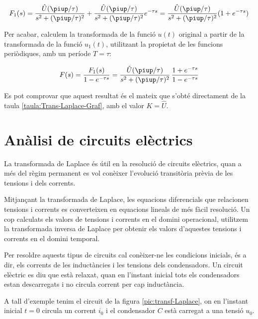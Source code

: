 \begin{exemple}[\CalcTransfLaplace{}]
    \[
        F_1(s) = \frac{\hat{U} (\piup/\tau)}{s^2 + (\piup/\tau)^2} +
        \frac{\hat{U} (\piup/\tau)}{s^2 + (\piup/\tau)^2} e^{-\tau s} =
        \frac{\hat{U} (\piup/\tau)}{s^2 + (\piup/\tau)^2} (1+e^{-\tau s})
    \]

    Per acabar, calculem la transformada de la funció $u(t)$ original a
    partir de la transformada de la funció $u_1(t)$, utilitzant la
    propietat de les funcions periòdiques, amb un període $T=\tau$:

    \[
        F(s) = \frac{F_1(s)}{1-e^{-\tau s}} =
        \frac{\hat{U} (\piup/\tau) }{s^2 + (\piup/\tau)^2}\,\frac{1+e^{-\tau s}}{1-e^{-\tau
        s}}
    \]

    Es pot comprovar que aquest resultat és el mateix que s'obté directament de la taula \vref{taula:Trans-Laplace-Graf}, amb el valor $K=\hat{U}$.
\end{exemple}

\section{Anàlisi de circuits elèctrics}

La transformada de Laplace és útil en la resolució de circuits
elèctrics, quan a més del règim permanent es vol conèixer
l'evolució transitòria prèvia de les tensions i dels corrents.

Mitjançant la transformada de Laplace, les equacions diferencials
que relacionen tensions i corrents es converteixen en equacions
lineals de més fàcil resolució. Un cop calculats els valors de
tensions i corrents en el domini operacional, utilitzem la
transformada inversa de Laplace per obtenir els valors d'aquestes
tensions i corrents en el domini temporal.

Per  resoldre aquests tipus de circuits cal conèixer-ne les
condicions inicials, és a dir, els corrents de les inductàncies i
les tensions dels condensadors. Un circuit elèctric es diu que està
relaxat, quan en l'instant inicial tots els condensadors estan
descarregats i no circula corrent per cap inductància.

A tall d'exemple tenim el circuit de la figura
\vref{pic:transf-Laplace}, on en l'instant inicial $t=0$ circula un
corrent $i_0$ i el condensador $C$ està carregat a una tensió $u_0$.

\begin{center}
    
    \label{pic:transf-Laplace}
\end{center}

